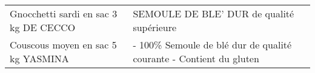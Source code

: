 \begin{longtable}{p{5cm}p{10cm}}
                                                                    Gnocchetti sardi en sac 3 kg DE CECCO &                                                                                                                                                                                                                                                                                                                                                                                                                                                                                                                                                                                                                                                                                                                                                                                                                                                                                                                                                                                                SEMOULE DE BLE' DUR de qualité supérieure \\
                                                                       Couscous moyen en sac 5 kg YASMINA &                                                                                                                                                                                                                                                                                                                                                                                                                                                                                                                                                                                                                                                                                                                                                                                                                                                                                                                                                                      - 100\% Semoule de blé dur de qualité courante  - Contient du gluten \\

\end{longtable}

